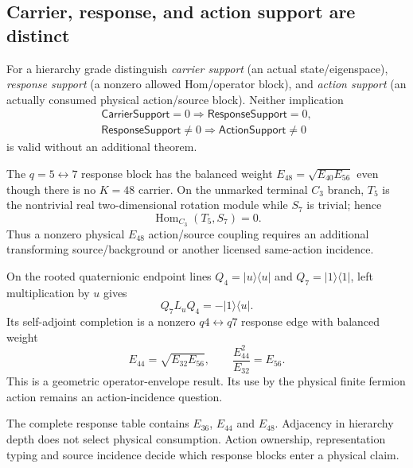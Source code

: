 \documentclass[12pt,a4paper]{article}
\begin{document}
\subsection{Carrier, response, and action support are distinct}
\label{p3c:sec:v187-response-support-taxonomy}

\begin{definition}
\label{p3c:def:v187-three-support-levels}
For a hierarchy grade distinguish
\emph{carrier support} (an actual state/eigenspace),
\emph{response support} (a nonzero allowed Hom/operator block), and
\emph{action support} (an actually consumed physical action/source block).
Neither implication
\[
\begin{gathered}
 \mathsf{CarrierSupport}=0\Rightarrow\mathsf{ResponseSupport}=0,\\
 \mathsf{ResponseSupport}\ne0\Rightarrow\mathsf{ActionSupport}\ne0
\end{gathered}
\]
is valid without an additional theorem.
\end{definition}

\begin{proposition}
\label{p3c:prop:v187-e48-terminal-symmetry-firewall}
The $q=5\leftrightarrow7$ response block has the balanced weight
$E_{48}=\sqrt{E_{40}E_{56}}$ even though there is no $K=48$ carrier.  On the
unmarked terminal $C_3$ branch, $T_5$ is the nontrivial real two-dimensional
rotation module while $S_7$ is trivial; hence
\[
 \boxed{\operatorname{Hom}_{C_3}(T_5,S_7)=0.}
\]
Thus a nonzero physical $E_{48}$ action/source coupling requires an additional
transforming source/background or another licensed same-action incidence.
\end{proposition}

\begin{proposition}
\label{p3c:prop:v187-e44-endpoint-edge}
On the rooted quaternionic endpoint lines
$Q_4=|u\rangle\langle u|$ and $Q_7=|1\rangle\langle1|$, left multiplication
by $u$ gives
\[
 \boxed{Q_7L_uQ_4=-|1\rangle\langle u|}.
\]
Its self-adjoint completion is a nonzero $q4\leftrightarrow q7$ response edge
with balanced weight
\[
 \boxed{E_{44}=\sqrt{E_{32}E_{56}}},\qquad
 \frac{E_{44}^2}{E_{32}}=E_{56}.
\]
This is a geometric operator-envelope result.  Its use by the physical finite
fermion action remains an action-incidence question.
\end{proposition}

\begin{remark}
\label{p3c:rem:v187-no-adjacency-selector}
The complete response table contains $E_{36}$, $E_{44}$ and $E_{48}$.
Adjacency in hierarchy depth does not select physical consumption.  Action
ownership, representation typing and source incidence decide which response
blocks enter a physical claim.
\end{remark}
\end{document}

